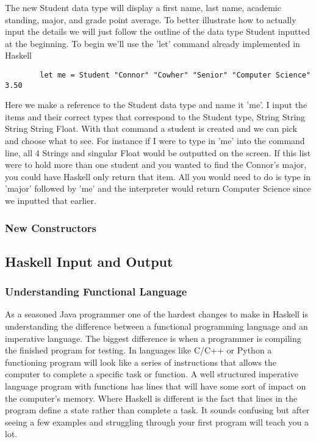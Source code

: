 \documentclass{article}
\begin{document}
    \noindent The new Student data type will display a first name, last name, academic standing, major, and grade point average. To better illustrate how to actually input the details we will just follow the outline of the data type Student inputted at the beginning. To begin we'll use the 'let' command already implemented in Haskell
    
    \begin{lstlisting}
        let me = Student "Connor" "Cowher" "Senior" "Computer Science" 3.50
    \end{lstlisting}
    \noindent Here we make a reference to the Student data type and name it 'me'. I input the items and their correct types that correspond to the Student type, String String String String Float. With that command a student is created and we can pick and choose what to see. For instance if I were to type in 'me' into the command line, all 4 Strings and singular Float would be outputted on the screen. If this list were to hold more than one student and you wanted to find the Connor's major, you could have Haskell only return that item. All you would need to do is type in 'major' followed by 'me' and the interpreter would return Computer Science since we inputted that earlier. 
    
    \subsubsection{New Constructors}
    
\subsection{Haskell Input and Output}
    \subsubsection{Understanding Functional Language}
    As a seasoned Java programmer one of the hardest changes to make in Haskell is understanding the difference between a functional programming language and an imperative language. The biggest difference is when a programmer is compiling the finished program for testing. In languages like C/C++ or Python a functioning program will look like a series of instructions that allows the computer to complete a specific task or function. A well structured imperative language program with functions has lines that will have some sort of impact on the computer's memory. Where Haskell is different is the fact that lines in the program define a state rather than complete a task. It sounds confusing but after seeing a few examples and struggling through your first program will teach you a lot. 
    
\end{document}
